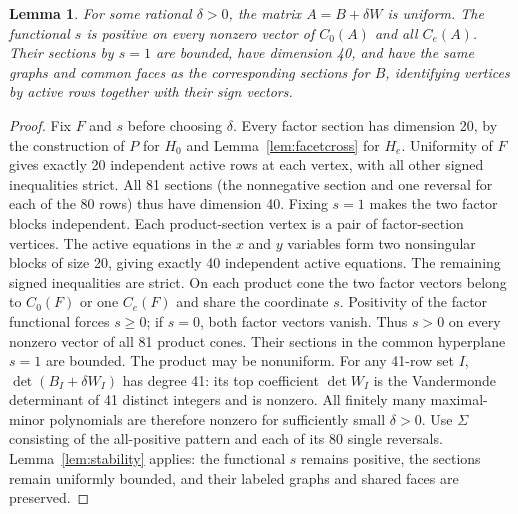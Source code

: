 \documentclass[11pt]{article}
\newtheorem{lemma}[theorem]{Lemma}
\theoremstyle{remark}
\begin{document}
\begin{lemma}\label{lem:preserve}
For some rational $\delta>0$, the matrix $A=B+\delta W$ is uniform.
The functional $s$ is positive on every nonzero vector of $C_0(A)$ and
all $C_e(A)$. Their sections by $s=1$ are bounded, have dimension 40,
and have the same
graphs and common faces as the corresponding sections for $B$,
identifying vertices by active rows together with their sign vectors.
\end{lemma}
\begin{proof}
Fix $F$ and $s$ before choosing $\delta$. Every factor section has dimension 20,
by the construction of $P$ for $H_0$ and Lemma~\ref{lem:facetcross} for $H_e$.
Uniformity of $F$ gives exactly 20 independent active rows at each vertex,
with all other signed inequalities strict. All 81 sections (the nonnegative section and one reversal for each
of the 80 rows) thus have dimension 40.
Fixing $s=1$ makes the two factor blocks independent. Each product-section
vertex is a pair of factor-section vertices. The active equations in
the $x$ and $y$ variables form two nonsingular blocks of size 20,
giving exactly 40 independent active equations. The remaining signed
inequalities are strict.
On each product cone the two factor vectors belong to $C_0(F)$ or one
$C_e(F)$ and share the coordinate $s$. Positivity of the factor functional
forces $s\ge0$; if $s=0$, both factor vectors vanish. Thus $s>0$ on
every nonzero vector of all 81 product cones. Their sections in the
common hyperplane $s=1$ are bounded. The product may be nonuniform.
For any 41-row set $I$,
$\det(B_I+\delta W_I)$ has degree 41: its top coefficient $\det W_I$ is the
Vandermonde determinant of 41 distinct integers and is nonzero.
All finitely many maximal-minor polynomials are therefore nonzero for
sufficiently small $\delta>0$.
Use $\Sigma$ consisting of the all-positive pattern and each of its
80 single reversals. Lemma~\ref{lem:stability} applies: the functional $s$ remains positive, the sections remain
uniformly bounded, and their labeled graphs and shared faces are preserved.
\end{proof}
\end{document}
